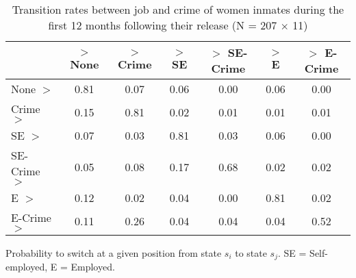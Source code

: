 \begin{table}[htp]
\footnotesize
\setlength{\tabcolsep}{10pt}
\renewcommand{\arraystretch}{1.3}
\begin{threeparttable}
\centering
\caption{Transition rates between job and crime of women inmates \newline
    during the first 12 months following their release (N = 207 $\times$ 11)} 
\label{tab:transition_rates_jobs_crime}
\begin{tabular}{lcccccc}
  \hline
 & $>$ None & $>$ Crime & $>$ SE & $>$ SE-Crime & $>$ E & $>$ E-Crime \\ 
  \hline
None $>$ & 0.81 & 0.07 & 0.06 & 0.00 & 0.06 & 0.00 \\ 
  Crime $>$ & 0.15 & 0.81 & 0.02 & 0.01 & 0.01 & 0.01 \\ 
  SE $>$ & 0.07 & 0.03 & 0.81 & 0.03 & 0.06 & 0.00 \\ 
  SE-Crime $>$ & 0.05 & 0.08 & 0.17 & 0.68 & 0.02 & 0.02 \\ 
  E $>$ & 0.12 & 0.02 & 0.04 & 0.00 & 0.81 & 0.02 \\ 
  E-Crime $>$ & 0.11 & 0.26 & 0.04 & 0.04 & 0.04 & 0.52 \\ 
   \hline
\end{tabular}
\begin{tablenotes}
\scriptsize
\item Probability to switch at a given position from state $s_i$ to state $s_j$. SE = Self-employed, E = Employed.
\end{tablenotes}
\end{threeparttable}
\end{table}
